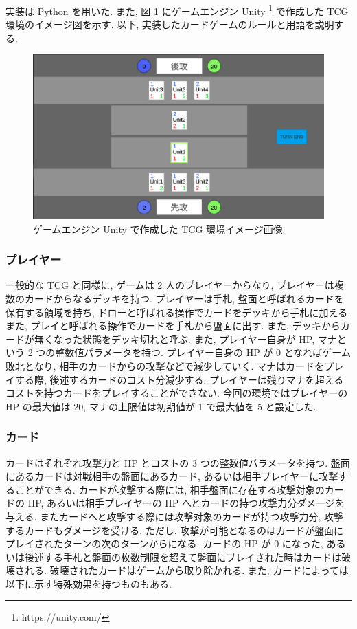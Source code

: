 \documentclass[12pt]{jarticle}
\begin{document}
実装は Python を用いた.
また, 図 \ref{fig:CardGameDemo} にゲームエンジン Unity \footnote[1]{https://unity.com/} で作成した TCG 環境のイメージ図を示す.
以下, 実装したカードゲームのルールと用語を説明する. 
\vspace{-0.3cm}
\begin{figure}[ht]
  \centering
  \includegraphics[width=170mm]{assets/cardgamedemo.eps}
  \vspace{-0.3cm}
  \caption{ゲームエンジン Unity で作成した TCG 環境イメージ画像}
  \label{fig:CardGameDemo}
\end{figure}
\subsubsection{プレイヤー}
一般的な TCG と同様に, ゲームは 2 人のプレイヤーからなり, プレイヤーは複数のカードからなるデッキを持つ. 
プレイヤーは手札, 盤面と呼ばれるカードを保有する領域を持ち, ドローと呼ばれる操作でカードをデッキから手札に加える. また, プレイと呼ばれる操作でカードを手札から盤面に出す. また, デッキからカードが無くなった状態をデッキ切れと呼ぶ.  
また, プレイヤー自身が HP, マナという 2 つの整数値パラメータを持つ.
プレイヤー自身の HP が 0 となればゲーム敗北となり, 相手のカードからの攻撃などで減少していく.
マナはカードをプレイする際, 後述するカードのコスト分減少する. プレイヤーは残りマナを超えるコストを持つカードをプレイすることができない. 
今回の環境ではプレイヤーの HP の最大値は 20, マナの上限値は初期値が 1 で最大値を 5 と設定した.
\subsubsection{カード}
カードはそれぞれ攻撃力と HP とコストの 3 つの整数値パラメータを持つ.  盤面にあるカードは対戦相手の盤面にあるカード, あるいは相手プレイヤーに攻撃することができる. カードが攻撃する際には, 相手盤面に存在する攻撃対象のカードの HP, あるいは相手プレイヤーの HP へとカードの持つ攻撃力分ダメージを与える. またカードへと攻撃する際には攻撃対象のカードが持つ攻撃力分, 攻撃するカードもダメージを受ける.
ただし, 攻撃が可能となるのはカードが盤面にプレイされたターンの次のターンからになる. 
カードの HP が 0 になった, あるいは後述する手札と盤面の枚数制限を超えて盤面にプレイされた時はカードは破壊される. 破壊されたカードはゲームから取り除かれる. 
また, カードによっては以下に示す特殊効果を持つものもある.
\end{document}

